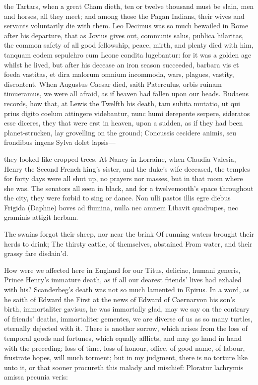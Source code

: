 {the Tartars, when a great Cham dieth, ten or twelve thousand must
be slain, men and horses, all they meet; and among those the
Pagan Indians, their wives and servants voluntarily die with
them. Leo Decimus was so much bewailed in Rome after his departure,
that as Jovius gives out, communis salus, publica hilaritas, the
common safety of all good fellowship, peace, mirth, and plenty died
with him, tanquam eodem sepulchro cum Leone condita lugebantur: for it
was a golden age whilst he lived, but after his decease an iron
season succeeded, barbara vis et foeda vastitas, et dira malorum omnium
incommoda, wars, plagues, vastity, discontent. When Augustus Caesar
died, saith Paterculus, orbis ruinam timueramus, we were all afraid, as
if heaven had fallen upon our heads. Budaeus records, how that,
at Lewis the Twelfth his death, tam subita mutatio, ut qui prius digito
coelum attingere videbantur, nunc humi derepente serpere, sideratos
esse diceres, they that were erst in heaven, upon a sudden, as if they
had been planet-strucken, lay grovelling on the ground;
Concussis cecidere animis, seu frondibus ingens
Sylva dolet lapsis---

they looked like cropped trees. At Nancy in Lorraine, when
Claudia Valesia, Henry the Second French king's sister, and the duke's
wife deceased, the temples for forty days were all shut up, no prayers
nor masses, but in that room where she was. The senators all seen in
black, and for a twelvemonth's space throughout the city, they were
forbid to sing or dance.
Non ulli pastos illis egre diebus
Frigida (Daphne) boves ad flumina, nulla nec amnem
Libavit quadrupes, nec graminis attigit herbam.

The swains forgot their sheep, nor near the brink
Of running waters brought their herds to drink;
The thirsty cattle, of themselves, abstained
From water, and their grassy fare disdain'd.

How were we affected here in England for our Titus, deliciae, humani
generis, Prince Henry's immature death, as if all our dearest friends'
lives had exhaled with his? Scanderbeg's death was not so much
lamented in Epirus. In a word, as he saith of Edward the First at
the news of Edward of Caernarvon his son's birth, immortaliter gavisus,
he was immortally glad, may we say on the contrary of friends' deaths,
immortaliter gementes, we are diverse of us as so many turtles,
eternally dejected with it.
There is another sorrow, which arises from the loss of temporal goods
and fortunes, which equally afflicts, and may go hand in hand with the
preceding; loss of time, loss of honour, office, of good name, of
labour, frustrate hopes, will much torment; but in my judgment, there
is no torture like unto it, or that sooner procureth this malady and
mischief:
Ploratur lachrymis amissa pecunia veris:

}

